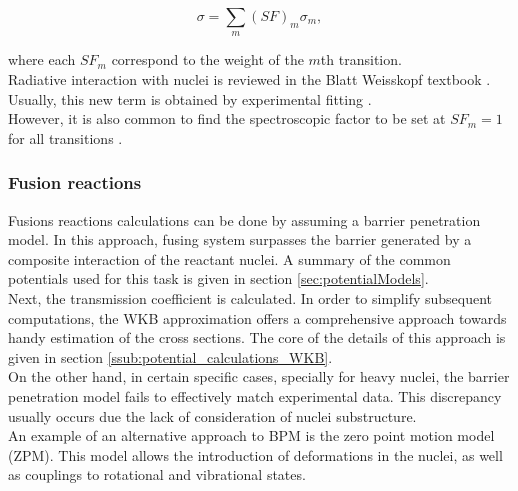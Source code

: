 \documentclass[openany]{book}
\begin{document}
\begin{equation}  \label{eq:radiativeCapture_crossSection_SF}
	\sigma = \sum_{m}{{(SF)}_m\sigma_m},		
\end{equation}

where each ${SF}_m$ correspond to the weight of the $m$th transition. \\ 

Radiative interaction with nuclei is reviewed in the Blatt Weisskopf textbook \cite{blatt_weisskopf_1952}. \\

Usually, this new term is obtained by experimental fitting \cite{kabir_nabi_2021, xu_takahashi_goriely_arnould_ohta_utsunomiya_2013}. \\

However, it is also common to find the spectroscopic factor to be set at $SF_m = 1$ for all transitions \cite{bertulani_1996}. \\

\subsubsection{Fusion reactions} \label{ssub:potential_calculations_fusion}

Fusions reactions calculations can be done by assuming a barrier penetration model. In this approach, fusing system surpasses the barrier generated by a composite interaction of the reactant nuclei. A summary of the common potentials used for this task is given in section \ref{sec:potentialModels}. \\

Next, the transmission coefficient is calculated. In order to simplify subsequent computations, the WKB approximation offers a comprehensive approach towards handy estimation of the cross sections. The core of the details of this approach is given in section \ref{ssub:potential_calculations_WKB}. \\

On the other hand, in certain specific cases, specially for heavy nuclei, the barrier penetration model fails to effectively match experimental data. This discrepancy usually occurs due the lack of consideration of nuclei substructure. \\

An example of an alternative approach to BPM is the zero point motion model (ZPM). This model allows the introduction of deformations in the nuclei, as well as couplings to rotational and vibrational states. 
\end{document}

